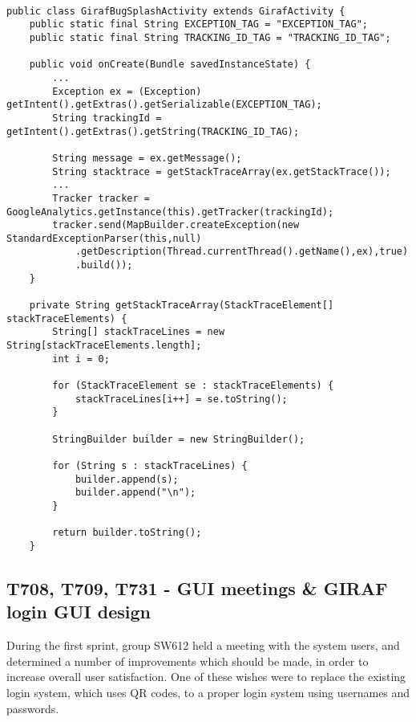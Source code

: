 \begin{minipage}[H]{\linewidth}
\begin{lstlisting}[caption = Our approach to outputting the stack trace, label = BugOurSol]

public class GirafBugSplashActivity extends GirafActivity {
	public static final String EXCEPTION_TAG = "EXCEPTION_TAG";
    public static final String TRACKING_ID_TAG = "TRACKING_ID_TAG";
    
	public void onCreate(Bundle savedInstanceState) {
		...
		Exception ex = (Exception) getIntent().getExtras().getSerializable(EXCEPTION_TAG); 
		String trackingId = getIntent().getExtras().getString(TRACKING_ID_TAG);
		
		String message = ex.getMessage();
        String stacktrace = getStackTraceArray(ex.getStackTrace());
        ...
        Tracker tracker = GoogleAnalytics.getInstance(this).getTracker(trackingId);
        tracker.send(MapBuilder.createException(new StandardExceptionParser(this,null)
            .getDescription(Thread.currentThread().getName(),ex),true)
            .build());
    }

	private String getStackTraceArray(StackTraceElement[] stackTraceElements) {
        String[] stackTraceLines = new String[stackTraceElements.length];
        int i = 0;
        
        for (StackTraceElement se : stackTraceElements) {
            stackTraceLines[i++] = se.toString();
        }
        
        StringBuilder builder = new StringBuilder();
        
        for (String s : stackTraceLines) {
            builder.append(s);
            builder.append("\n");
        }
        
        return builder.toString();
    }
\end{lstlisting}
\end{minipage}

\subsection{T708, T709, T731 -  GUI meetings \& GIRAF login GUI design}
During the first sprint, group SW612 held a meeting with the system users, and
determined a number of improvements which should be made, in order to increase
overall user satisfaction. One of these wishes were to replace the existing
login system, which uses QR codes, to a proper login system using usernames and
passwords.\nl


